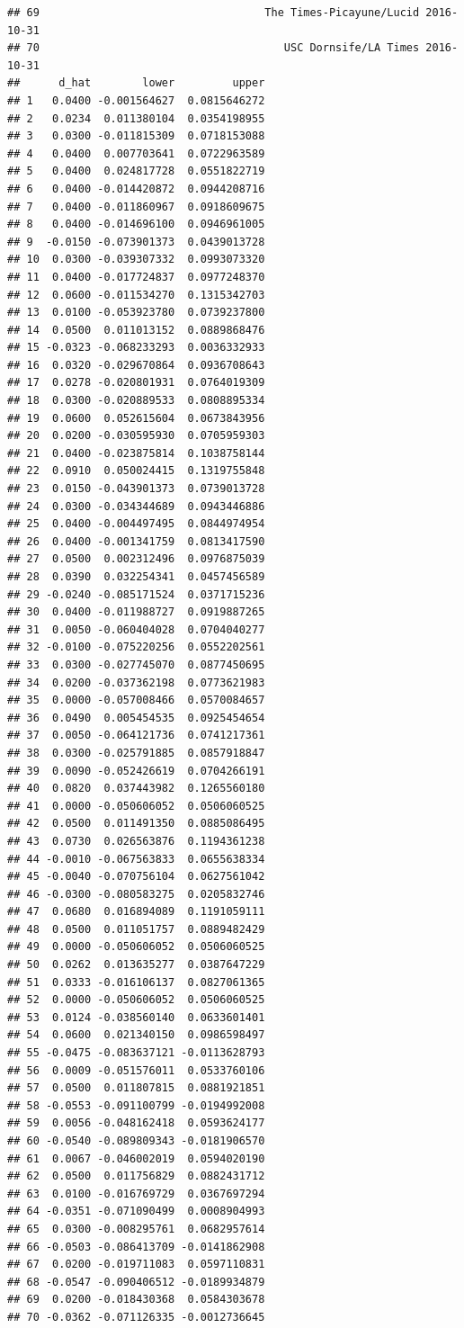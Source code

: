 \documentclass[
]{article}
\begin{document}
\begin{verbatim}
## 69                                   The Times-Picayune/Lucid 2016-10-31
## 70                                      USC Dornsife/LA Times 2016-10-31
##      d_hat        lower         upper
## 1   0.0400 -0.001564627  0.0815646272
## 2   0.0234  0.011380104  0.0354198955
## 3   0.0300 -0.011815309  0.0718153088
## 4   0.0400  0.007703641  0.0722963589
## 5   0.0400  0.024817728  0.0551822719
## 6   0.0400 -0.014420872  0.0944208716
## 7   0.0400 -0.011860967  0.0918609675
## 8   0.0400 -0.014696100  0.0946961005
## 9  -0.0150 -0.073901373  0.0439013728
## 10  0.0300 -0.039307332  0.0993073320
## 11  0.0400 -0.017724837  0.0977248370
## 12  0.0600 -0.011534270  0.1315342703
## 13  0.0100 -0.053923780  0.0739237800
## 14  0.0500  0.011013152  0.0889868476
## 15 -0.0323 -0.068233293  0.0036332933
## 16  0.0320 -0.029670864  0.0936708643
## 17  0.0278 -0.020801931  0.0764019309
## 18  0.0300 -0.020889533  0.0808895334
## 19  0.0600  0.052615604  0.0673843956
## 20  0.0200 -0.030595930  0.0705959303
## 21  0.0400 -0.023875814  0.1038758144
## 22  0.0910  0.050024415  0.1319755848
## 23  0.0150 -0.043901373  0.0739013728
## 24  0.0300 -0.034344689  0.0943446886
## 25  0.0400 -0.004497495  0.0844974954
## 26  0.0400 -0.001341759  0.0813417590
## 27  0.0500  0.002312496  0.0976875039
## 28  0.0390  0.032254341  0.0457456589
## 29 -0.0240 -0.085171524  0.0371715236
## 30  0.0400 -0.011988727  0.0919887265
## 31  0.0050 -0.060404028  0.0704040277
## 32 -0.0100 -0.075220256  0.0552202561
## 33  0.0300 -0.027745070  0.0877450695
## 34  0.0200 -0.037362198  0.0773621983
## 35  0.0000 -0.057008466  0.0570084657
## 36  0.0490  0.005454535  0.0925454654
## 37  0.0050 -0.064121736  0.0741217361
## 38  0.0300 -0.025791885  0.0857918847
## 39  0.0090 -0.052426619  0.0704266191
## 40  0.0820  0.037443982  0.1265560180
## 41  0.0000 -0.050606052  0.0506060525
## 42  0.0500  0.011491350  0.0885086495
## 43  0.0730  0.026563876  0.1194361238
## 44 -0.0010 -0.067563833  0.0655638334
## 45 -0.0040 -0.070756104  0.0627561042
## 46 -0.0300 -0.080583275  0.0205832746
## 47  0.0680  0.016894089  0.1191059111
## 48  0.0500  0.011051757  0.0889482429
## 49  0.0000 -0.050606052  0.0506060525
## 50  0.0262  0.013635277  0.0387647229
## 51  0.0333 -0.016106137  0.0827061365
## 52  0.0000 -0.050606052  0.0506060525
## 53  0.0124 -0.038560140  0.0633601401
## 54  0.0600  0.021340150  0.0986598497
## 55 -0.0475 -0.083637121 -0.0113628793
## 56  0.0009 -0.051576011  0.0533760106
## 57  0.0500  0.011807815  0.0881921851
## 58 -0.0553 -0.091100799 -0.0194992008
## 59  0.0056 -0.048162418  0.0593624177
## 60 -0.0540 -0.089809343 -0.0181906570
## 61  0.0067 -0.046002019  0.0594020190
## 62  0.0500  0.011756829  0.0882431712
## 63  0.0100 -0.016769729  0.0367697294
## 64 -0.0351 -0.071090499  0.0008904993
## 65  0.0300 -0.008295761  0.0682957614
## 66 -0.0503 -0.086413709 -0.0141862908
## 67  0.0200 -0.019711083  0.0597110831
## 68 -0.0547 -0.090406512 -0.0189934879
## 69  0.0200 -0.018430368  0.0584303678
## 70 -0.0362 -0.071126335 -0.0012736645
\end{verbatim}
\end{document}
